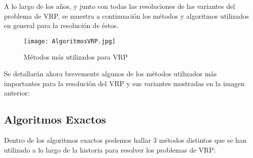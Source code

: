 \documentclass[letter, 10pt]{article}
\begin{document}
A lo largo de los años, y junto con todas las resoluciones de las variantes del problema de VRP, se muestra a continuación los métodos y algoritmos utilizados en general para la resolución de éstos.\\

\begin{figure}[h]
    \centering
    \texttt{[image: AlgoritmosVRP.jpg]}
    \caption{Métodos más utilizados para VRP  \cite{LIN20141118}}
    \label{fig:figura1}
\end{figure}

Se detallarán ahora brevemente algunos de los métodos utilizados más importantes para la resolución del VRP y sus variantes mostradas en la imagen anterior:

\subsection{Algoritmos Exactos}
Dentro de los algoritmos exactos podemos hallar 3 métodos distintos que se han utilizado a lo largo de la historia para resolver los problemas de VRP:
\end{document}
